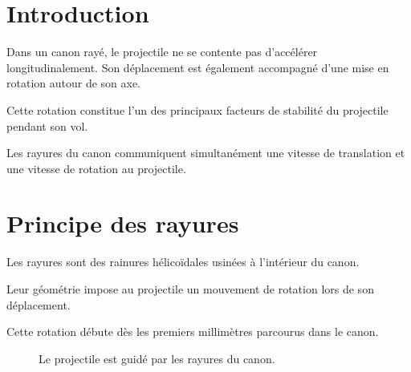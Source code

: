 
\section{Introduction}

Dans un canon rayé, le projectile ne se contente pas d'accélérer
longitudinalement. Son déplacement est également accompagné d'une mise en
rotation autour de son axe.

Cette rotation constitue l'un des principaux facteurs de stabilité du
projectile pendant son vol.

\begin{aretenir}

Les rayures du canon communiquent simultanément une vitesse de translation et
une vitesse de rotation au projectile.

\end{aretenir}

\section{Principe des rayures}

Les rayures sont des rainures hélicoïdales usinées à l'intérieur du canon.

Leur géométrie impose au projectile un mouvement de rotation lors de son
déplacement.

Cette rotation débute dès les premiers millimètres parcourus dans le canon.

\begin{figure}[htbp]
\centering


\caption{Le projectile est guidé par les rayures du canon.}
\label{fig:canon_raye}

\end{figure}


